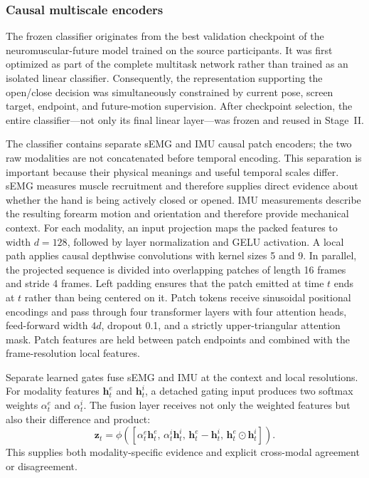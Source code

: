 \subsubsection{Causal multiscale encoders}

The frozen classifier originates from the best validation checkpoint of the
neuromuscular-future model trained on the source participants.  It was first
optimized as part of the complete multitask network rather than trained as an
isolated linear classifier.  Consequently, the representation supporting the
open/close decision was simultaneously constrained by current pose, screen
target, endpoint, and future-motion supervision.  After checkpoint selection,
the entire classifier---not only its final linear layer---was frozen and reused
in Stage~II.

The classifier contains separate sEMG and IMU causal patch encoders; the two
raw modalities are not concatenated before temporal encoding.  This separation
is important because their physical meanings and useful temporal scales differ.
sEMG measures muscle recruitment and therefore supplies direct evidence about
whether the hand is being actively closed or opened.  IMU measurements describe
the resulting forearm motion and orientation and therefore provide mechanical
context.  For each modality, an input projection maps the packed features to
width $d=128$, followed by layer normalization and GELU activation.  A local
path applies causal depthwise convolutions with kernel sizes 5 and 9.  In
parallel, the projected sequence is divided into overlapping patches of length
16 frames and stride 4 frames.  Left padding ensures that the patch emitted at
time $t$ ends at $t$ rather than being centered on it.  Patch tokens receive
sinusoidal positional encodings and pass through four transformer layers with
four attention heads, feed-forward width $4d$, dropout 0.1, and a strictly
upper-triangular attention mask.  Patch features are held between patch
endpoints and combined with the frame-resolution local features.

Separate learned gates fuse sEMG and IMU at the context and local resolutions.
For modality features $\mathbf{h}^{e}_t$ and $\mathbf{h}^{i}_t$, a detached
gating input produces two softmax weights $\alpha^e_t$ and $\alpha^i_t$.  The
fusion layer receives not only the weighted features but also their difference
and product:
\begin{equation}
 \mathbf{z}_t = \phi\!\left(
  [\alpha^e_t\mathbf{h}^{e}_t,\,
   \alpha^i_t\mathbf{h}^{i}_t,\,
   \mathbf{h}^{e}_t-\mathbf{h}^{i}_t,\,
   \mathbf{h}^{e}_t\odot\mathbf{h}^{i}_t]
 \right).
\end{equation}
This supplies both modality-specific evidence and explicit cross-modal
agreement or disagreement.


